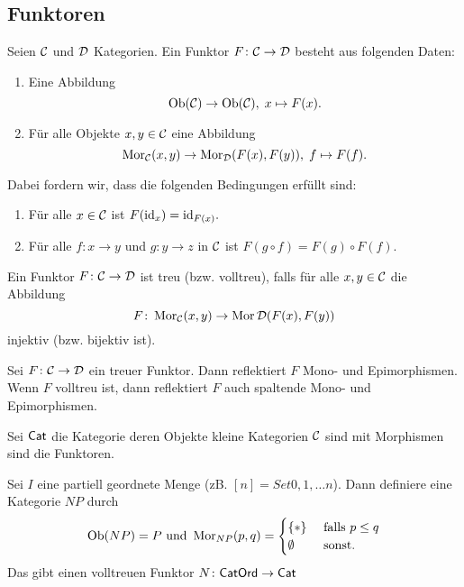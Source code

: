 \subsection{Funktoren}
\begin{Def}[Funktor]
    Seien \(\mathcal{C}\) und \(\mathcal{D}\) Kategorien. Ein Funktor \(F\colon\mathcal{C}\to\mathcal{D}\) besteht aus folgenden Daten:
    \begin{enumerate}
        \item Eine Abbildung \[\operatorname{Ob}(\mathcal{C})\to\operatorname{Ob}(\mathcal{C}),\; x\mapsto F(x).\]
        \item Für alle Objekte \(x,y\in\mathcal{C}\) eine Abbildung 
        \[\operatorname{Mor}_{\mathcal{C}}(x,y)\to\operatorname{Mor}_{\mathcal{D}}(F(x),F(y)),\; f\mapsto F(f).\]
    \end{enumerate} Dabei fordern wir, dass die folgenden Bedingungen erfüllt sind:
    \begin{enumerate}
        \item Für alle \(x\in\mathcal{C}\) ist \(F(\mathrm{id}_x)=\mathrm{id}_{F(x)}.\)
        \item Für alle \(f\colon x\to y\) und \(g\colon y\to z\) in \(\mathcal{C}\) ist \(F(g\circ f)=F(g)\circ F(f).\)
    \end{enumerate}
    Ein Funktor \(F\colon\mathcal{C}\to\mathcal{D}\) ist treu (bzw. volltreu), falls für alle \(x,y\in \mathcal{C}\) die Abbildung \[F\colon\operatorname{Mor}_{\mathcal{C}}(x,y)\to\operatorname{Mor}\mathcal{D}(F(x),F(y))\]  injektiv (bzw. bijektiv ist).
\end{Def}
\begin{Bem}
    Sei \(F\colon\mathcal{C}\to \mathcal{D}\) ein treuer Funktor. Dann reflektiert \(F\) Mono- und Epimorphismen. Wenn \(F\) volltreu ist, dann reflektiert \(F\) auch spaltende Mono- und Epimorphismen.
\end{Bem}
\begin{Def}
    Sei \(\mathsf{Cat}\) die Kategorie deren Objekte kleine Kategorien \(\mathcal{C}\) sind mit Morphismen sind die Funktoren.
\end{Def}
\begin{Def}
    Sei \(I\) eine partiell geordnete Menge (zB. \([n]=Set{0,1,\dots n}\)). Dann definiere eine Kategorie \(N P\) durch $$\operatorname{Ob}(N P)=P\text{ und } \operatorname{Mor}_{N P}(p,q)=\begin{cases}
        \{*\} & \text{ falls } p\leq q\\
        \emptyset & \text{ sonst.}
    \end{cases}$$
    Das gibt einen volltreuen Funktor \(N\colon \mathsf{CatOrd}\to\mathsf{Cat}\) 
\end{Def}
